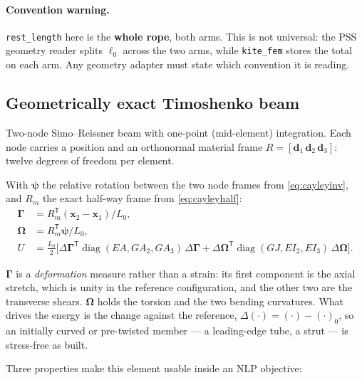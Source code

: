 \documentclass[11pt,a4paper]{article}
\newcommand{\code}[1]{\texttt{\small #1}}
\begin{document}
\paragraph{Convention warning.} \code{rest\_length} here is the \textbf{whole
rope}, both arms. This is not universal: the PSS geometry reader splits $\ell_0$
across the two arms, while \code{kite\_fem} stores the total on each arm. Any
geometry adapter must state which convention it is reading.

\subsection{Geometrically exact Timoshenko beam}

Two-node Simo--Reissner beam with one-point (mid-element) integration. Each node
carries a position and an orthonormal material frame $R = [\mathbf{d}_1\,
\mathbf{d}_2\, \mathbf{d}_3]$: twelve degrees of freedom per element.

With $\boldsymbol{\psi}$ the relative rotation between the two node frames from
\eqref{eq:cayleyinv}, and $R_m$ the exact half-way frame from
\eqref{eq:cayleyhalf}:
\begin{align}
  \boldsymbol{\Gamma} &= R_m^{\mathsf T}(\mathbf{x}_2-\mathbf{x}_1)/L_0,
    \label{eq:beamgamma}\\[2pt]
  \boldsymbol{\Omega} &= R_m^{\mathsf T}\boldsymbol{\psi}/L_0,
    \label{eq:beamomega}\\[2pt]
  U &= \frac{L_0}{2}\Big[
     \Delta\boldsymbol{\Gamma}^{\mathsf T}\operatorname{diag}(EA, GA_2, GA_3)\,\Delta\boldsymbol{\Gamma}
   + \Delta\boldsymbol{\Omega}^{\mathsf T}\operatorname{diag}(GJ, EI_2, EI_3)\,\Delta\boldsymbol{\Omega}
    \Big].
    \label{eq:beamenergy}
\end{align}

$\boldsymbol{\Gamma}$ is a \emph{deformation} measure rather than a strain: its
first component is the axial stretch, which is unity in the reference
configuration, and the other two are the transverse shears.
$\boldsymbol{\Omega}$ holds the torsion and the two bending curvatures. What
drives the energy is the change against the reference,
$\Delta(\cdot) = (\cdot) - (\cdot)_0$, so an initially curved or pre-twisted
member --- a leading-edge tube, a strut --- is stress-free as built.

Three properties make this element usable inside an NLP objective:
\end{document}
